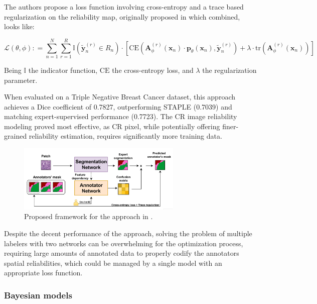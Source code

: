 The authors propose a loss function involving cross-entropy and a trace based
regularization on the reliability map, originally proposed in
\cite{ZhangEtAl2020} which combined, looks like:

\begin{equation}
  \mathcal{L}(\theta, \phi) : = \sum_{n=1}^{N} \sum_{r=1}^{R}
  \mathbb{I} \left( \tilde{\mathbf{y}}_{n}^{(r)} \in R_n \right)
  \cdot \left[ \text{CE} \left( \mathbf{A}_{\phi}^{(r)}
      (\mathbf{x}_n) \cdot \mathbf{p}_{\theta} (\mathbf{x}_n),
    \tilde{\mathbf{y}}_{n}^{(r)} \right) + \lambda \cdot \text{tr}
  \left( \mathbf{A}_{\phi}^{(r)} (\mathbf{x}_n) \right) \right]
\end{equation}

Being $\mathbb{I}$ the indicator function, $\text{CE}$ the cross-entropy loss,
and $\lambda$ the regularization parameter.

When evaluated on a Triple Negative Breast Cancer dataset, this
approach achieves a Dice coefficient of 0.7827, outperforming STAPLE
(0.7039) and matching expert-supervised performance (0.7723). The CR
image reliability modeling proved most effective, as CR pixel, while
potentially offering finer-grained reliability estimation, requires
significantly more training data.

\begin{figure}
  \centering
  \includegraphics[width=0.7\textwidth]{Cap1/Figures/lopez_2024_proposed_framework.png}
  \caption{Proposed framework for the approach in \cite{LopezEtAl2024}.}
  \label{fig:lopez_2024_proposed_framework}
\end{figure}

Despite the decent performance of the approach, solving the problem
of multiple labelers with two networks can be overwhelming for the
optimization process, requiring large amounts of annotated data to
properly codify the annotators spatial reliabilities, which could be
managed by a single model with an appropriate loss function.
\subsubsection{Bayesian models}\label{subsec:bayesian_models}

